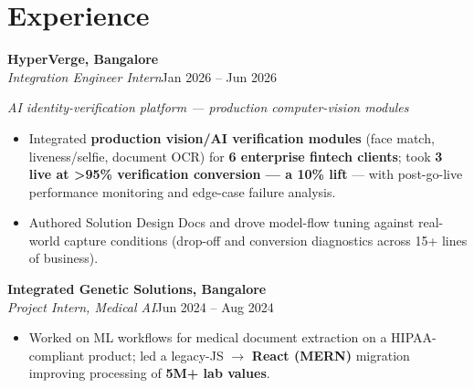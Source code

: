 \documentclass[10pt,a4paper]{article}
\begin{document}
\section*{Experience}
\vspace{1pt}\textbf{HyperVerge, Bangalore}\\
\textit{Integration Engineer Intern}\hfill Jan 2026 -- Jun 2026\par\vspace{1pt}
{\small\itshape AI identity-verification platform --- production computer-vision modules}\par\vspace{1pt}
\begin{itemize}
\item Integrated \textbf{production vision/AI verification modules} (face match, liveness/selfie, document OCR) for \textbf{6 enterprise fintech clients}; took \textbf{3 live at \textgreater{}95\% verification conversion --- a 10\% lift} --- with post-go-live performance monitoring and edge-case failure analysis.
\item Authored Solution Design Docs and drove model-flow tuning against real-world capture conditions (drop-off and conversion diagnostics across 15+ lines of business).
\end{itemize}
\vspace{1pt}\textbf{Integrated Genetic Solutions, Bangalore}\\
\textit{Project Intern, Medical AI}\hfill Jun 2024 -- Aug 2024\par\vspace{1pt}
\begin{itemize}
\item Worked on ML workflows for medical document extraction on a HIPAA-compliant product; led a legacy-JS $\rightarrow$ \textbf{React (MERN)} migration improving processing of \textbf{5M+ lab values}.
\end{itemize}
\end{document}
